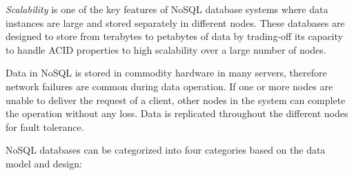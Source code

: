 \documentclass[a4paper,12pt]{book}
\begin{document}
	\textit{Scalability} is one of the key features of NoSQL database systems where data instances are large and stored separately in different nodes. These databases are designed to store from terabytes to petabytes of data by trading-off its capacity to handle ACID properties to high scalability over a large number of nodes\cite{abramova2013nosql}. 	
   \par  Data in NoSQL is stored in commodity hardware in many servers, therefore network failures are common during data operation. If one or more nodes are unable to deliver the request of a client,  other nodes in the system can complete the operation without any loss. Data is replicated throughout the different nodes for fault tolerance.%
    \par 
NoSQL databases can be categorized into four categories based on the data model and design:
\end{document}
